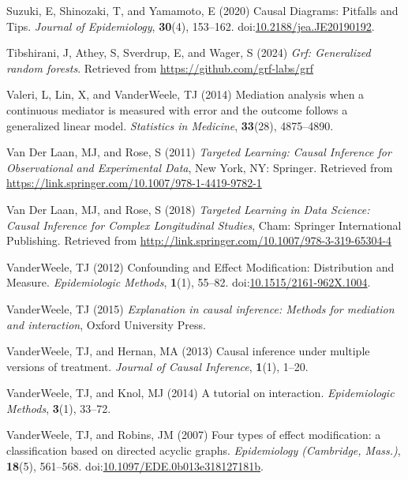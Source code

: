 \documentclass[
  single column]{article}
\newlength{\cslhangindent}
\newenvironment{CSLReferences}[2] %
 {\begin{list}{}{%
  \setlength{\itemindent}{0pt}
  \setlength{\leftmargin}{0pt}
  \setlength{\parsep}{0pt}
  \ifodd #1
   \setlength{\leftmargin}{\cslhangindent}
   \setlength{\itemindent}{-1\cslhangindent}
  \fi
  \setlength{\itemsep}{#2\baselineskip}}}
 {\end{list}}
\begin{document}
\begin{CSLReferences}{1}{0}
Suzuki, E, Shinozaki, T, and Yamamoto, E (2020) Causal Diagrams:
Pitfalls and Tips. \emph{Journal of Epidemiology}, \textbf{30}(4),
153--162.
doi:\href{https://doi.org/10.2188/jea.JE20190192}{10.2188/jea.JE20190192}.

Tibshirani, J, Athey, S, Sverdrup, E, and Wager, S (2024) \emph{Grf:
Generalized random forests}. Retrieved from
\url{https://github.com/grf-labs/grf}

Valeri, L, Lin, X, and VanderWeele, TJ (2014) Mediation analysis when a
continuous mediator is measured with error and the outcome follows a
generalized linear model. \emph{Statistics in Medicine},
\textbf{33}(28), 4875--4890.

Van Der Laan, MJ, and Rose, S (2011) \emph{Targeted Learning: Causal
Inference for Observational and Experimental Data}, New York, NY:
Springer. Retrieved from
\url{https://link.springer.com/10.1007/978-1-4419-9782-1}

Van Der Laan, MJ, and Rose, S (2018) \emph{Targeted Learning in Data
Science: Causal Inference for Complex Longitudinal Studies}, Cham:
Springer International Publishing. Retrieved from
\url{http://link.springer.com/10.1007/978-3-319-65304-4}

VanderWeele, TJ (2012) Confounding and Effect Modification: Distribution
and Measure. \emph{Epidemiologic Methods}, \textbf{1}(1), 55--82.
doi:\href{https://doi.org/10.1515/2161-962X.1004}{10.1515/2161-962X.1004}.

VanderWeele, TJ (2015) \emph{Explanation in causal inference: Methods
for mediation and interaction}, Oxford University Press.

VanderWeele, TJ, and Hernan, MA (2013) Causal inference under multiple
versions of treatment. \emph{Journal of Causal Inference},
\textbf{1}(1), 1--20.

VanderWeele, TJ, and Knol, MJ (2014) A tutorial on interaction.
\emph{Epidemiologic Methods}, \textbf{3}(1), 33--72.

VanderWeele, TJ, and Robins, JM (2007) Four types of effect
modification: a classification based on directed acyclic graphs.
\emph{Epidemiology (Cambridge, Mass.)}, \textbf{18}(5), 561--568.
doi:\href{https://doi.org/10.1097/EDE.0b013e318127181b}{10.1097/EDE.0b013e318127181b}.


\end{CSLReferences}
\end{document}
